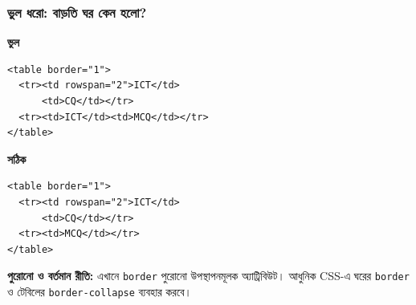 \subsubsection{ভুল ধরো: বাড়তি ঘর কেন হলো?}
\noindent
\begin{minipage}[t]{.48\linewidth}\vspace{0pt}
\textbf{ভুল}\par
\begin{verbatim}
<table border="1">
  <tr><td rowspan="2">ICT</td>
      <td>CQ</td></tr>
  <tr><td>ICT</td><td>MCQ</td></tr>
</table>
\end{verbatim}
\end{minipage}\hfill
\begin{minipage}[t]{.48\linewidth}\vspace{0pt}
\textbf{সঠিক}\par
\begin{verbatim}
<table border="1">
  <tr><td rowspan="2">ICT</td>
      <td>CQ</td></tr>
  <tr><td>MCQ</td></tr>
</table>
\end{verbatim}
\end{minipage}
\textbf{পুরোনো ও বর্তমান রীতি:} এখানে \texttt{border} পুরোনো উপস্থাপনমূলক অ্যাট্রিবিউট। আধুনিক CSS-এ ঘরের \texttt{border} ও টেবিলের \texttt{border-collapse} ব্যবহার করবে।
